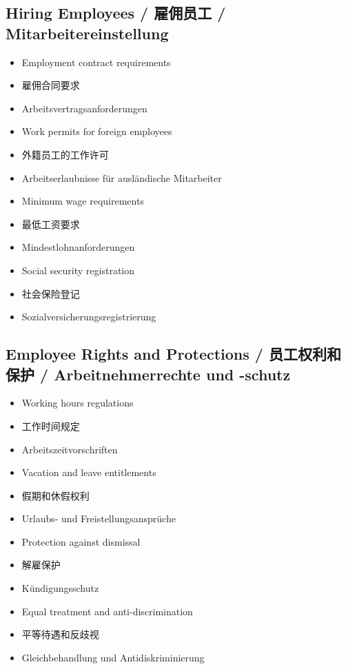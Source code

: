 \subsection{Hiring Employees / 雇佣员工 / Mitarbeitereinstellung}
\begin{itemize}
    \item Employment contract requirements
    \item 雇佣合同要求
    \item Arbeitsvertragsanforderungen
    \item Work permits for foreign employees
    \item 外籍员工的工作许可
    \item Arbeitserlaubnisse für ausländische Mitarbeiter
    \item Minimum wage requirements
    \item 最低工资要求
    \item Mindestlohnanforderungen
    \item Social security registration
    \item 社会保险登记
    \item Sozialversicherungsregistrierung
\end{itemize}

\subsection{Employee Rights and Protections / 员工权利和保护 / Arbeitnehmerrechte und -schutz}
\begin{itemize}
    \item Working hours regulations
    \item 工作时间规定
    \item Arbeitszeitvorschriften
    \item Vacation and leave entitlements
    \item 假期和休假权利
    \item Urlaubs- und Freistellungsansprüche
    \item Protection against dismissal
    \item 解雇保护
    \item Kündigungsschutz
    \item Equal treatment and anti-discrimination
    \item 平等待遇和反歧视
    \item Gleichbehandlung und Antidiskriminierung
\end{itemize}

